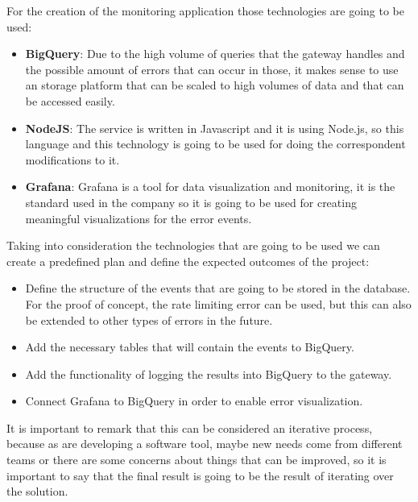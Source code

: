 \documentclass[12pt]{article}
\begin{document}
For the creation of the monitoring application those technologies are going to be used:

\begin{itemize}
    \item \textbf{BigQuery}: Due to the high volume of queries that the gateway handles and the possible amount of errors that can occur in those, it makes sense to use an storage platform that can be scaled to high volumes of data and that can be accessed easily.
    \item \textbf{NodeJS}: The service is written in Javascript and it is using Node.js, so this language and this technology is going to be used for doing the correspondent modifications to it.
    \item \textbf{Grafana}: Grafana is a tool for data visualization and monitoring, it is the standard used in the company so it is going to be used for creating meaningful visualizations for the error events.
\end{itemize}

Taking into consideration the technologies that are going to be used we can create a predefined plan and define the expected outcomes of the project:

\begin{itemize}
    \item Define the structure of the events that are going to be stored in the database. For the proof of concept, the rate limiting error can be used, but this can also be extended to other types of errors in the future.
    \item Add the necessary tables that will contain the events to BigQuery.
    \item Add the functionality of logging the results into BigQuery to the gateway.
    \item Connect Grafana to BigQuery in order to enable error visualization.
\end{itemize}

It is important to remark that this can be considered an iterative process, because as  are developing a software tool, maybe new needs come from different teams or there are some concerns about things that can be improved, so it is important to say that the final result is going to be the result of iterating over the solution.
\end{document}
